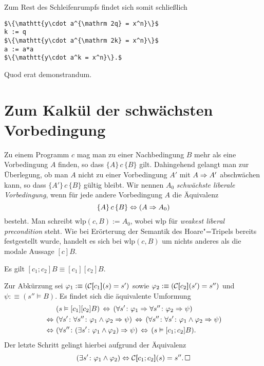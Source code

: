 Zum Rest des Schleifenrumpfs findet sich somit schließlich
\begin{lstlisting}[language=IMP, xleftmargin=\mathindent, mathescape]
$\{\mathtt{y\cdot a^{\mathrm 2q} = x^n}\}$
k := q
$\{\mathtt{y\cdot a^{\mathrm 2k} = x^n}\}$
a := a*a
$\{\mathtt{y\cdot a^k = x^n}\}.$
\end{lstlisting}
Quod erat demonstrandum.

\section{Zum Kalkül der schwächsten Vorbedingung}

Zu einem Programm $c$ mag man zu einer Nachbedingung $B$ mehr als eine
Vorbedingung $A$ finden, so dass $\{A\}\,c\,\{B\}$ gilt. Dahingehend
gelangt man zur Überlegung, ob man $A$ nicht zu einer Vorbedingung $A'$
mit $A\Rightarrow A'$ abschwächen kann, so dass $\{A'\}\,c\,\{B\}$ gültig
bleibt. Wir nennen $A_0$ \emph{schwächste liberale Vorbedingung},
wenn für jede andere Vorbedingung $A$ die Äquivalenz
\[\{A\}\,c\,\{B\}\Leftrightarrow (A\Rightarrow A_0)\]
besteht. Man schreibt $\mathrm{wlp}(c,B):=A_0$, wobei $\mathrm{wlp}$ für
\emph{weakest liberal precondition} steht. Wie bei Erörterung der
Semantik des Hoare"=Tripels bereits festgestellt wurde, handelt es sich
bei $\mathrm{wlp}(c,B)$ um nichts anderes als die modale Aussage $[c]B$.

\begin{Satz}
Es gilt $[c_1;c_2]B\equiv [c_1][c_2]B$.
\end{Satz}
\begin{Beweis}
Zur Abkürzung sei $\varphi_1:\equiv(\mathcal C[\hspace{-2.6pt}[c_1]\hspace{-2.4pt}](s)=s')$ sowie
$\varphi_2:\equiv(\mathcal C[\hspace{-2.6pt}[c_2]\hspace{-2.4pt}](s')=s'')$ und $\psi:\equiv (s''\models B)$.
Es findet sich die äquivalente Umformung
\begin{align*}
&(s\vDash [c_1][c_2]B) \,\Leftrightarrow\, (\forall s'\colon\varphi_1\Rightarrow \forall s''\colon\varphi_2\Rightarrow\psi)\\
\,\Leftrightarrow\,\, &(\forall s'\colon\forall s''\colon\varphi_1\land\varphi_2\Rightarrow\psi)
\,\Leftrightarrow\, (\forall s''\colon\forall s'\colon\varphi_1\land\varphi_2\Rightarrow\psi)\\
\,\Leftrightarrow\,\, &(\forall s''\colon (\exists s'\colon\varphi_1\land\varphi_2)\Rightarrow\psi)
\,\Leftrightarrow\, (s\vDash [c_1;c_2]B).
\end{align*}
Der letzte Schritt gelingt hierbei aufgrund der Äquivalenz
\[(\exists s'\colon\varphi_1\land\varphi_2)\Leftrightarrow
\mathcal C[\hspace{-2.6pt}[c_1;c_2]\hspace{-2.4pt}](s)=s''.\,\Box\]
\end{Beweis}

